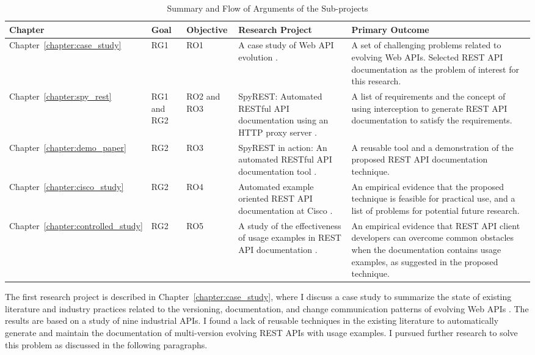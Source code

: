 \begin{table}
  \caption{Summary and Flow of Arguments of the Sub-projects}
  \begin{tabular}{|p{1.5cm}|p{1.5cm}|p{1.5cm}|p{4.5cm}|p{6cm}|}
  \hline
  Chapter & Goal & Objective & Research Project & Primary Outcome \\
  \hline
  Chapter~\ref{chapter:case_study}  & RG1 & RO1 & A case study of Web API evolution \cite{sohan2015case}. & A set of challenging problems related to evolving Web APIs. Selected REST API documentation as the problem of interest for this research. \\
  \hline
  Chapter~\ref{chapter:spy_rest} & RG1 and RG2 & RO2 and RO3 & SpyREST: Automated RESTful API documentation using an HTTP proxy server \cite{sohan2015spyrest}. & A list of requirements and the concept of using interception to generate REST API documentation to satisfy the requirements. \\
  \hline
  Chapter~\ref{chapter:demo_paper} & RG2 & RO3 & SpyREST in action: An automated RESTful API documentation tool \cite{sohan2015spyrest_tool}. & A reusable tool and a demonstration of the proposed REST API documentation technique. \\
  \hline
  Chapter~\ref{chapter:cisco_study} & RG2 & RO4 & Automated example oriented REST API documentation at Cisco \cite{sohan_cisco}. & An empirical evidence that the proposed technique is feasible for practical use, and a list of problems for potential future research.\\
  \hline
  Chapter~\ref{chapter:controlled_study} & RG2 & RO5 & A study of the effectiveness of usage examples in REST API documentation \cite{sohan_vlhcc}. & An empirical evidence that REST API client developers can overcome common obstacles when the documentation contains usage examples, as suggested in the proposed technique.\\
  \hline
\end{tabular}
\label{table:chapter_summary}
\end{table}

The first research project is described in Chapter~\ref{chapter:case_study}, where I discuss a case study to summarize the state of existing literature and industry practices related to the versioning, documentation, and change communication patterns of evolving Web APIs \cite{sohan2015case}. The results are based on a study of nine industrial APIs. I found a lack of reusable techniques in the existing literature to automatically generate and maintain the documentation of multi-version evolving REST APIs with usage examples. I pursued further research to solve this problem as discussed in the following paragraphs.

